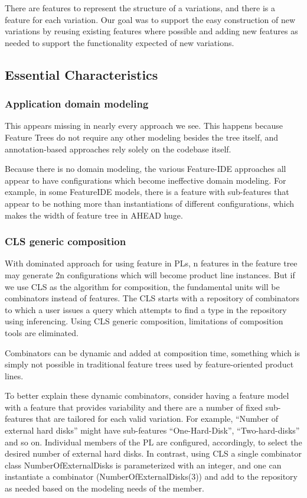 
There are features to represent the structure of a variations, and there is a feature for each variation.
Our goal was to support the easy construction of new variations by reusing existing features where possible
and adding new features as needed to support the functionality expected of new variations.


\subsection{Essential Characteristics}

\subsubsection{Application domain modeling}

This appears missing in nearly every approach we see. This happens because Feature Trees do not require any
other modeling besides the tree itself, and annotation-based approaches rely solely on the codebase itself.

Because there is no domain modeling, the various Feature-IDE approaches all appear to have configurations
which become ineffective domain modeling. For example, in some FeatureIDE models,
there is a feature with sub-features that appear to be nothing more than instantiations of different
configurations, which makes the width of feature tree in AHEAD huge.

\subsubsection{CLS generic composition}

With dominated approach for using feature in PLs, n features in the feature tree may generate 2n configurations
 which will become product line instances. But if we use CLS as the algorithm for composition, the fundamental
 units will be combinators instead of features. The CLS starts with a repository of combinators to which a user
 issues a query which attempts to find a type in the repository using inferencing. Using CLS generic composition,
 limitations of composition tools are eliminated.


Combinators can be dynamic and added at composition time, something which is simply not possible in traditional
feature trees used by feature-oriented product lines.

To better explain these dynamic combinators, consider having a feature model with a feature that provides
variability and there are a number of fixed sub-features that are tailored for each valid variation.
For example, “Number of external hard disks” might have sub-features “One-Hard-Disk”, “Two-hard-disks” and
so on. Individual members of the PL are configured, accordingly, to select the desired number of external hard
disks. In contrast, using CLS a single combinator class NumberOfExternalDisks is parameterized with an integer,
and one can instantiate a combinator (NumberOfExternalDisks(3)) and add to the repository as needed based on
the modeling needs of the member.

